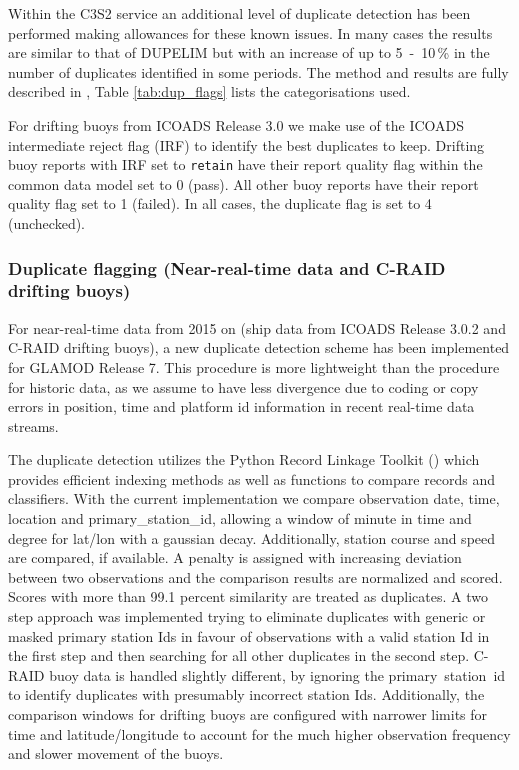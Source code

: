 {Within the C3S2 service an additional level of duplicate detection has been performed making allowances for these known issues.
In many cases the results are similar to that of DUPELIM but with an increase of up to 5~-~10\,\% in the number of duplicates identified in some periods.
The method and results are fully described in \cite{Kent2019dup}, Table \ref{tab:dup_flags} lists the categorisations used.

For drifting buoys from ICOADS Release 3.0 we make use of the ICOADS intermediate reject flag (IRF) to identify the best duplicates to keep.
Drifting buoy reports with IRF set to \texttt{retain} have their report quality flag within the common data model set to 0 (pass).
All other buoy reports have their report quality flag set to 1 (failed). In all cases, the duplicate flag is set to 4 (unchecked).


\FloatBarrier

\subsubsection{Duplicate flagging (Near-real-time data and C-RAID drifting buoys)}\label{nrt-dupelim}
For near-real-time data from 2015 on (ship data from ICOADS Release 3.0.2 and C-RAID drifting buoys), a new duplicate detection scheme has been implemented for GLAMOD Release 7.
This procedure is more lightweight than the procedure for historic data, as we assume to have less divergence due to coding or copy errors in position, time and platform id information in recent real-time data streams.

The duplicate detection utilizes the Python Record Linkage Toolkit (\cite{jonathan_de_bruin_2023_8169000}) which provides efficient indexing methods as well as functions to compare records and classifiers.
With the current implementation we compare observation date, time, location and primary\_station\_id, allowing a window of  minute in time and  degree for lat/lon with a gaussian decay. Additionally, station course and speed are compared, if available.
A penalty is assigned with increasing deviation between two observations and the comparison results are normalized and scored.
Scores with more than 99.1 percent similarity are treated as duplicates. 
A two step approach was implemented trying to eliminate duplicates with generic or masked primary station Ids in favour of observations with a valid station Id in the first step and then searching for all other duplicates in the second step.
C-RAID buoy data is handled slightly different, by ignoring the primary\ station\ id to identify duplicates with presumably incorrect station Ids.
Additionally, the comparison windows for drifting buoys are configured with narrower limits for time and latitude/longitude to account for the much higher observation frequency and slower movement of the buoys.

}
